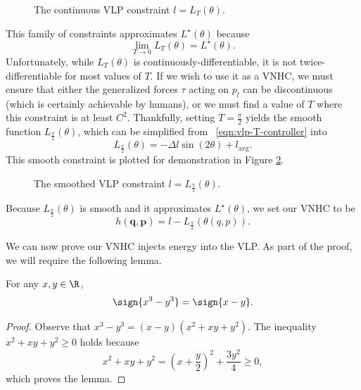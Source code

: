 \begin{figure}
   \centering
   
   \caption{The continuous VLP constraint \(l = L_T(\theta)\).}
   \label{fig:vlp-T-controller}
\end{figure}

This family of constraints approximates \(L^\star(\theta)\) because 
\[
   \lim\limits_{T \rightarrow 0} L_T(\theta) = L^\star(\theta)
   .
\]
Unfortunately, while \(L_T(\theta)\) is continuously-differentiable, 
it is not twice-differentiable for most values of \(T\).
If we wish to use it as a VNHC, we must ensure that either the generalized
forces \(\tau\) acting on \(p_l\) can be discontinuous (which is certainly
achievable by humans), or we must find a value of \(T\) where this constraint is
at least \(C^2\).
Thankfully, setting \(T = \frac{\pi}{2}\) yields the smooth function 
\(L_{\frac{\pi}{2}}(\theta)\), which can be simplified from
~\eqref{eqn:vlp-T-controller} into
\begin{equation}\label{eqn:vlp-smoothed-controller}
   L_\frac{\pi}{2}(\theta) = -\Delta l \sin(2\theta) + l_{\text{avg}}
   .
\end{equation}
This smooth constraint is plotted for demonstration in Figure
\ref{fig:vlp-smoothed-controller}.

\begin{figure}
   \centering
   
   \caption{The smoothed VLP constraint \(l = L_\frac{\pi}{2}(\theta)\).}
   \label{fig:vlp-smoothed-controller}
\end{figure}

Because \(L_\frac{\pi}{2}(\theta)\) is smooth and it approximates
\(L^\star(\theta)\), we set our VNHC to be
\[
   h(\mathbf{q},\mathbf{p}) = l - L_\frac{\pi}{2}\left(\theta(q,p)\right)
   .
\]

We can now prove our VNHC injects energy into the VLP. 
As part of the proof, we will require the following lemma.

\begin{lemma}\label{lemma:sign-of-cube}
   For any \(x,y \in \R\),
   \[
      \sign{x^3 - y^3} = \sign{x-y}
      .
   \]
\end{lemma}
\begin{proof}
   Observe that \(x^3 - y^3 =  (x-y)(x^2 + xy + y^2)\).
   The inequality \(x^2 + xy + y^2 \geq 0\) holds because
   \[
      x^2 + xy + y^2 = \left(x  + \frac{y}{2}\right)^2 + \frac{3y^2}{4} \geq 0
      ,
   \]
   which proves the lemma.
\end{proof}

